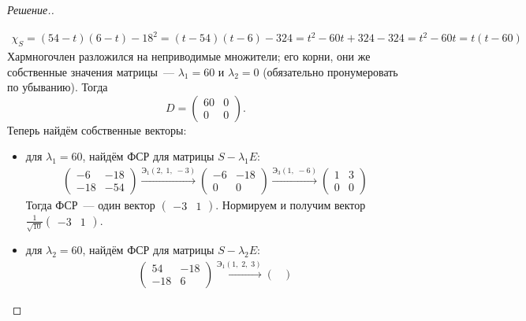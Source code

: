 \documentclass[a4paper]{article}
\theoremstyle{remark}
\newcommand{\arron}[3]{%
  \ensuremath{\xrightarrow{\text{Э}_1(#1,\; #2,\; #3)}}%
}
\newcommand{\arrth}[2]{%
  \ensuremath{\xrightarrow{\text{Э}_3(#1,\; #2)}}%
}
\begin{document}
\begin{proof}[Решение.]
\begin{enumerate}
\begin{align*}
              \chi_S = (54 - t)(6 - t) - 18^2 = (t - 54)(t - 6) - 324 = t^2 - 60t + 324 - 324 = t^2 - 60t = t(t - 60) 
            \end{align*}
            Хармногочлен разложился на неприводимые множители; его корни, они же собственные значения матрицы~--- $\lambda_1 = 60$ и $\lambda_2 = 0$ (обязательно пронумеровать по убыванию). Тогда
            \begin{equation*}
              D = \begin{pmatrix}
                60 & 0 \\
                0 & 0
              \end{pmatrix}.
            \end{equation*}
            Теперь найдём собственные векторы:
            \begin{itemize}
              \item для $\lambda_1 = 60$, найдём ФСР для матрицы $S - \lambda_1 E$:
              \begin{align*}
                \begin{pmatrix}
                  -6 & -18 \\
                  -18 & -54
                \end{pmatrix} \arron{2}{1}{-3} \begin{pmatrix}
                  -6 & -18 \\
                  0 & 0
                \end{pmatrix} \arrth{1}{-6} \begin{pmatrix}
                  1 & 3 \\
                  0 & 0
                \end{pmatrix}
              \end{align*}
              Тогда ФСР~--- один вектор $\begin{pmatrix}
                -3 & 1
              \end{pmatrix}$. Нормируем и получим вектор $\frac{1}{\sqrt{10}}\begin{pmatrix}
                -3 & 1
              \end{pmatrix}$.
              \item для $\lambda_2 = 60$, найдём ФСР для матрицы $S - \lambda_2 E$:
              \begin{align*}
                \begin{pmatrix}
                  54 & -18 \\
                  -18 & 6
                \end{pmatrix} \arron{1}{2}{3} \begin{pmatrix}

\end{pmatrix}
\end{align*}
\end{itemize}
\end{enumerate}
\end{proof}
\end{document}
